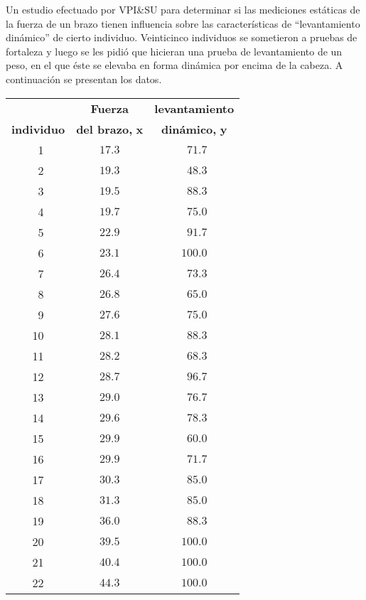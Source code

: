 \begin{enunciado}
 Un estudio efectuado por VPI\&SU para determinar
 si las mediciones estáticas de la fuerza de un brazo tienen influencia
 sobre las características de ``levantamiento dinámico''
 de cierto individuo.
 Veinticinco individuos se sometieron a pruebas de fortaleza y luego se les pidió que hicieran una prueba de levantamiento de un peso, en el que éste se elevaba en forma dinámica por encima de la cabeza.
 A continuación se presentan los datos.
 \begin{center}
  \begin{tabular}{c|c|c}
   & \textbf{Fuerza} & \textbf{levantamiento} \\
   \textbf{individuo} & \textbf{del brazo,} $\mathbf{x}$ &
   \textbf{dinámico,} $\mathbf{y}$ \\
   \hline 
   $\phantom{1}$1 & $17.3$ & $\phantom{1}71.7$ \\
   $\phantom{1}$2 & $19.3$ & $\phantom{1}48.3$ \\
   $\phantom{1}$3 & $19.5$ & $\phantom{1}88.3$ \\
   $\phantom{1}$4 & $19.7$ & $\phantom{1}75.0$ \\
   $\phantom{1}$5 & $22.9$ & $\phantom{1}91.7$ \\
   $\phantom{1}$6 & $23.1$ & $100.0$ \\
   $\phantom{1}$7 & $26.4$ & $\phantom{1}73.3$ \\
   $\phantom{1}$8 & $26.8$ & $\phantom{1}65.0$ \\
   $\phantom{1}$9 & $27.6$ & $\phantom{1}75.0$ \\
   10 & $28.1$ & $\phantom{1}88.3$ \\
   11 & $28.2$ & $\phantom{1}68.3$ \\
   12 & $28.7$ & $\phantom{1}96.7$ \\
   13 & $29.0$ & $\phantom{1}76.7$ \\
   14 & $29.6$ & $\phantom{1}78.3$ \\
   15 & $29.9$ & $\phantom{1}60.0$ \\
   16 & $29.9$ & $\phantom{1}71.7$ \\
   17 & $30.3$ & $\phantom{1}85.0$ \\
   18 & $31.3$ & $\phantom{1}85.0$ \\
   19 & $36.0$ & $\phantom{1}88.3$ \\
   20 & $39.5$ & $100.0$ \\
   21 & $40.4$ & $100.0$ \\
   22 & $44.3$ & $100.0$ \\

\end{tabular}
\end{center}
\end{enunciado}
